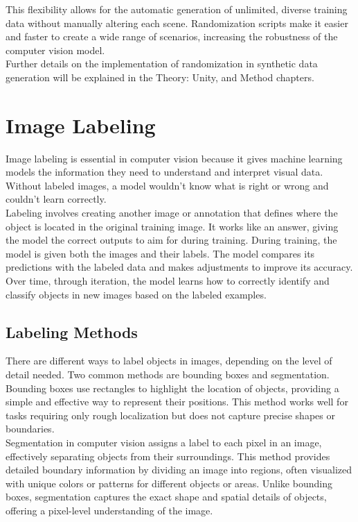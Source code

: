 \noindent This flexibility allows for the automatic generation of unlimited, diverse training data without manually altering each scene. Randomization scripts make it easier and faster to create a wide range of scenarios, increasing the robustness of the computer vision model.\\

\noindent Further details on the implementation of randomization in synthetic data generation will be explained in the Theory: Unity, and Method chapters.


\section{Image Labeling}

Image labeling is essential in computer vision because it gives machine learning models the information they need to understand and interpret visual data. Without labeled images, a model wouldn’t know what is right or wrong and couldn’t learn correctly. \cite{Labelling}\\

\noindent Labeling involves creating another image or annotation that defines where the object is located in the original training image. It works like an answer, giving the model the correct outputs to aim for during training. During training, the model is given both the images and their labels. The model compares its predictions with the labeled data and makes adjustments to improve its accuracy. Over time, through iteration, the model learns how to correctly identify and classify objects in new images based on the labeled examples. \cite{Labelling}

\subsection{Labeling Methods}

There are different ways to label objects in images, depending on the level of detail needed. Two common methods are bounding boxes and segmentation.\\

\noindent Bounding boxes use rectangles to highlight the location of objects, providing a simple and effective way to represent their positions. This method works well for tasks requiring only rough localization but does not capture precise shapes or boundaries.\\

\noindent Segmentation in computer vision assigns a label to each pixel in an image, effectively separating objects from their surroundings. This method provides detailed boundary information by dividing an image into regions, often visualized with unique colors or patterns for different objects or areas. Unlike bounding boxes, segmentation captures the exact shape and spatial details of objects, offering a pixel-level understanding of the image. \cite{labelingMethods}

